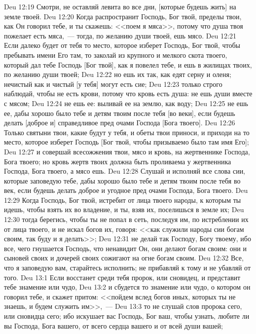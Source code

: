 \vs Deu 12:19 Смотри, не оставляй левита во все дни, [которые будешь жить] на земле твоей.
\rsbpar\vs Deu 12:20 Когда распространит Господь, Бог твой, пределы твои, как Он говорил тебе, и ты скажешь: <<поем я мяса>>, потому что душа твоя пожелает есть мяса,~--- тогда, по желанию души твоей, ешь мясо.
\vs Deu 12:21 Если далеко будет от тебя то место, которое изберет Господь, Бог твой, чтобы пребывать имени Его там, то заколай из крупного и мелкого скота твоего, который дал тебе Господь [Бог твой], как я повелел тебе, и ешь в жилищах твоих, по желанию души твоей;
\vs Deu 12:22 но ешь их так, как едят серну и оленя; нечистый как и чистый [у тебя] могут есть сие;
\vs Deu 12:23 только строго наблюдай, чтобы не есть крови, потому что кровь есть душа: не ешь души вместе с мясом;
\vs Deu 12:24 не ешь ее: выливай ее на землю, как воду;
\vs Deu 12:25 не ешь ее, дабы хорошо было тебе и детям твоим после тебя [во веки], если будешь делать [доброе и] справедливое пред очами Господа [Бога твоего].
\vs Deu 12:26 Только святыни твои, какие будут у тебя, и обеты твои приноси, и приходи на то место, которое изберет Господь [Бог твой, чтобы призываемо было там имя Его];
\vs Deu 12:27 и совершай всесожжения твои, мясо и кровь, на жертвеннике Господа, Бога твоего; но кровь  жертв твоих должна быть проливаема у жертвенника Господа, Бога твоего, а мясо ешь.
\vs Deu 12:28 Слушай и исполняй все слова сии, которые заповедую тебе, дабы хорошо было тебе и детям твоим после тебя во век, если будешь делать доброе и угодное пред очами Господа, Бога твоего.
\rsbpar\vs Deu 12:29 Когда Господь, Бог твой, истребит от лица твоего народы, к которым ты идешь, чтобы взять их во владение, и ты, взяв их, поселишься в земле их;
\vs Deu 12:30 тогда берегись, чтобы ты не попал в сеть, последуя им, по истреблении их от лица твоего, и не искал богов их, говоря: <<как служили народы сии богам своим, так буду и я делать>>;
\vs Deu 12:31 не делай так Господу, Богу твоему, ибо все, чего гнушается Господь, что ненавидит Он, они делают богам своим: они и сыновей своих и дочерей своих сожигают на огне богам своим.
\vs Deu 12:32 Все, что я заповедую вам, старайтесь исполнить; не прибавляй к тому и не убавляй от того.
\vs Deu 13:1 Если восстанет среди тебя пророк, или сновидец, и представит тебе знамение или чудо,
\vs Deu 13:2 и сбудется то знамение или чудо, о котором он говорил тебе, и скажет притом: <<пойдем вслед богов иных, которых ты не знаешь, и будем служить им>>,~---
\vs Deu 13:3 то не слушай слов пророка сего, или сновидца сего; ибо  искушает вас Господь, Бог ваш, чтобы узнать, любите ли вы Господа, Бога вашего, от всего сердца вашего и от всей души вашей;
